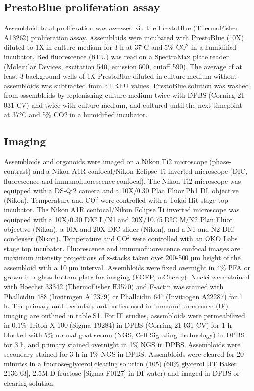 \begin{refsection}
    \subsection{PrestoBlue proliferation assay}
    Assembloid total proliferation was assessed via the PrestoBlue (ThermoFisher A13262) proliferation assay. Assembloids were incubated with PrestoBlue (10X) diluted to 1X in culture medium for 3 h at 37°C and 5\% CO$^2$ in a humidified incubator. Red fluorescence (RFU) was read on a SpectraMax plate reader (Molecular Devices, excitation 540, emission 600, cutoff 590). The average of at least 3 background wells of 1X PrestoBlue diluted in culture medium without assembloids was subtracted from all RFU values. PrestoBlue solution was washed from assembloids by replenishing culture medium twice with DPBS (Corning 21-031-CV) and twice with culture medium, and cultured until the next timepoint at 37°C and 5\% CO2 in a humidified incubator.
    
    \subsection{Imaging}
    Assembloids and organoids were imaged on a Nikon Ti2 microscope (phase-contrast) and a Nikon A1R confocal/Nikon Eclipse Ti inverted microscope (DIC, fluorescence and immunofluorescence confocal). The Nikon Ti2 microscope was equipped with a DS-Qi2 camera and a 10X/0.30 Plan Fluor Ph1 DL objective (Nikon). Temperature and CO$^2$ were controlled with a Tokai Hit stage top incubator. The Nikon A1R confocal/Nikon Eclipse Ti inverted microscope was equipped with a 10X/0.30 DIC L/N1 and 20X/10.75 DIC M/N2 Plan Fluor objective (Nikon), a 10X and 20X DIC slider (Nikon), and a N1 and N2 DIC condenser (Nikon). Temperature and CO$^2$ were controlled with an OKO Labs stage top incubator.
    Fluorescence and immunofluorescence confocal images are maximum intensity projections of z-stacks taken over 200-500 µm height of the assembloid with a 10 µm interval. Assembloids were fixed overnight in 4\% PFA or grown in a glass bottom plate for imaging (EGFP, mCherry). Nuclei were stained with Hoechst 33342 (ThermoFisher H3570) and F-actin was stained with Phalloidin 488 (Invitrogen A12379) or Phalloidin 647 (Invitrogen A22287) for 1 h. The primary and secondary antibodies used in immunofluorescence (IF) imaging are outlined in table S1. For IF studies, assembloids were permeabilized in 0.1\% Triton X-100 (Sigma T9284) in DPBS (Corning 21-031-CV) for 1 h, blocked with 5\% normal goat serum (NGS, Cell Signaling Technology) in DPBS for 3 h, and primary stained overnight in 1\% NGS in DPBS. Assembloids were secondary stained for 3 h in 1\% NGS in DPBS. Assembloids were cleared for 20 minutes in a fructose-glycerol clearing solution (105) (60\% glycerol [JT Baker 2136-03], 2.5M D-fructose [Sigma F0127] in DI water) and imaged in DPBS or clearing solution. 


\end{refsection}
